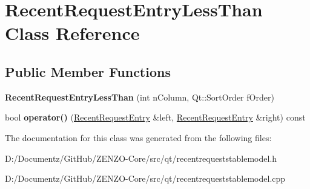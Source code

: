 \hypertarget{class_recent_request_entry_less_than}{}\section{Recent\+Request\+Entry\+Less\+Than Class Reference}
\label{class_recent_request_entry_less_than}
\subsection*{Public Member Functions}
\begin{DoxyCompactItemize}
\item 
\mbox{\label{class_recent_request_entry_less_than_a978c435f706bc5526a322ecb88f63e41}} 
{\bfseries Recent\+Request\+Entry\+Less\+Than} (int n\+Column, Qt\+::\+Sort\+Order f\+Order)
\item 
\mbox{\label{class_recent_request_entry_less_than_ae81233db157bd5d494dc5b98de6be7dd}} 
bool {\bfseries operator()} (\mbox{\hyperlink{class_recent_request_entry}{Recent\+Request\+Entry}} \&left, \mbox{\hyperlink{class_recent_request_entry}{Recent\+Request\+Entry}} \&right) const
\end{DoxyCompactItemize}


The documentation for this class was generated from the following files\+:\begin{DoxyCompactItemize}
\item 
D\+:/\+Documentz/\+Git\+Hub/\+Z\+E\+N\+Z\+O-\/\+Core/src/qt/recentrequeststablemodel.\+h\item 
D\+:/\+Documentz/\+Git\+Hub/\+Z\+E\+N\+Z\+O-\/\+Core/src/qt/recentrequeststablemodel.\+cpp\end{DoxyCompactItemize}
